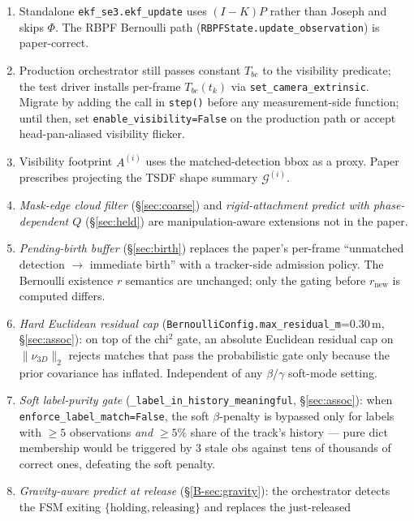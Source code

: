 \documentclass[11pt]{article}
\newcommand{\code}[1]{\texttt{\small #1}}
\begin{document}
\begin{enumerate}[leftmargin=2em,itemsep=0pt,topsep=2pt]
\item Standalone \code{ekf\_se3.ekf\_update} uses $(I-K)P$ rather than
   Joseph and skips $\Phi$. The RBPF Bernoulli path
   (\code{RBPFState.update\_observation}) is paper-correct.
\item Production orchestrator still passes constant $T_{bc}$ to the
   visibility predicate; the test driver installs per-frame
   $T_{bc}(t_k)$ via \code{set\_camera\_extrinsic}. Migrate by adding
   the call in \code{step()} before any measurement-side function;
   until then, set \code{enable\_visibility=False} on the production
   path or accept head-pan-aliased visibility flicker.
\item Visibility footprint $A^{(i)}$ uses the matched-detection bbox as
   a proxy. Paper prescribes projecting the TSDF shape summary
   $\mathcal G^{(i)}$.
\item \emph{Mask-edge cloud filter} (\S\ref{sec:coarse}) and
   \emph{rigid-attachment predict with phase-dependent $Q$}
   (\S\ref{sec:held}) are manipulation-aware extensions not in the
   paper.
\item \emph{Pending-birth buffer} (\S\ref{sec:birth}) replaces the
   paper's per-frame ``unmatched detection $\to$ immediate birth''
   with a tracker-side admission policy. The Bernoulli existence
   $r$ semantics are unchanged; only the gating before $r_{\text{new}}$
   is computed differs.
\item \emph{Hard Euclidean residual cap}
   (\code{BernoulliConfig.max\_residual\_m}=$0.30$\,m, \S\ref{sec:assoc}):
   on top of the chi$^2$ gate, an absolute Euclidean residual cap on
   $\|\nu_{3D}\|_2$ rejects matches that pass the probabilistic gate
   only because the prior covariance has inflated. Independent of any
   $\beta/\gamma$ soft-mode setting.
\item \emph{Soft label-purity gate}
   (\code{\_label\_in\_history\_meaningful}, \S\ref{sec:assoc}): when
   \code{enforce\_label\_match=False}, the soft $\beta$-penalty is
   bypassed only for labels with $\ge 5$ observations \emph{and}
   $\ge 5\%$ share of the track's history — pure dict membership
   would be triggered by 3 stale obs against tens of thousands of
   correct ones, defeating the soft penalty.
\item \emph{Gravity-aware predict at release} (\S\ref{B-sec:gravity}):
   the orchestrator detects the FSM exiting
   $\{\text{holding},\text{releasing}\}$ and replaces the just-released

\end{enumerate}
\end{document}
